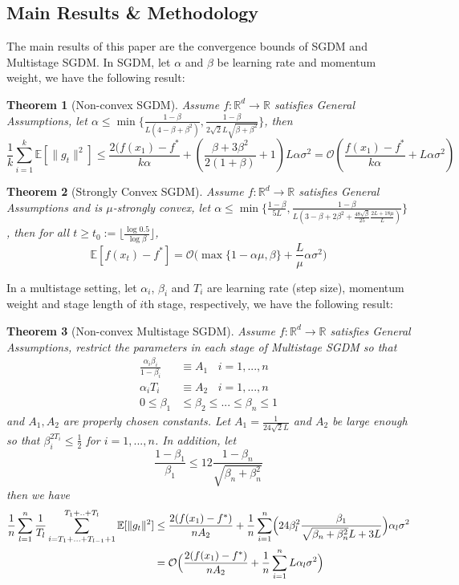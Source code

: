 \documentclass{article}
\newtheorem{theorem}{Theorem}[section]
\begin{document}
\subsection{Main Results \& Methodology}
The main results of this paper are the convergence bounds of SGDM and Multistage SGDM. In SGDM, let $\alpha$ and $\beta$ be learning rate and momentum weight, we have the following result:
\begin{theorem}[Non-convex SGDM]
	\label{theom41} Assume $f:\mathbb{R}^d \rightarrow \mathbb{R}$ satisfies General Assumptions, let $\alpha \leq \min\{\frac{1 - \beta}{L(4 - \beta + \beta^2)}, \frac{1 - \beta}{2\sqrt{2}L\sqrt{\beta + \beta^2}}\}$, then
	\[
		\frac{1}{k}\sum_{i = 1}^{k}\mathbb{E}[\|g_t\|^2] \leq \frac{2 (f(x_1) - f^*}{k\alpha} + (\frac{\beta + 3\beta^2}{2 (1 + \beta)} + 1)L\alpha\sigma^2 = \mathcal{O}(\frac{f(x_1) - f^*}{k\alpha} + L\alpha\sigma^2)
	\]
\end{theorem}
\begin{theorem}[Strongly Convex SGDM]
	\label{theom42} Assume $f:\mathbb{R}^d \rightarrow \mathbb{R}$ satisfies General Assumptions and is $\mu$-strongly convex, let $\alpha \leq \min\{\frac{1 - \beta}{5L}, \frac{1 - \beta}{L(3 - \beta + 2\beta^2 + \frac{48\sqrt{\beta}}{25}\frac{2L + 18\mu}{L})}\}$, then for all $t \geq t_0:= \lfloor\frac{\log 0.5}{\log \beta}\rfloor$, 
	\[
		\mathbb{E}[f(x_t) - f^*] = \mathcal{O}\bigl(\max\{1 - \alpha\mu, \beta\} + \frac{L}{\mu}\alpha\sigma^2\bigr)
	\]
\end{theorem}
In a multistage setting, let $\alpha_i$, $\beta_i$ and $T_i$ are learning rate (step size), momentum weight and stage length of $i$th stage, respectively, we have the following result:
\begin{theorem}[Non-convex Multistage SGDM]
	\label{theom43} Assume $f:\mathbb{R}^d \rightarrow \mathbb{R}$ satisfies General Assumptions, restrict the parameters in each stage of Multistage SGDM so that 
\begin{equation}
\label{eq41}
\begin{split}
\frac{\alpha_i\beta_i}{1 - \beta_i} &\equiv A_1 \ \ \ \ i = 1,...,n\\
\alpha_iT_i &\equiv A_2 \ \ \ \ i = 1,...,n\\
0 \leq \beta_1 &\leq \beta_2 \leq ... \leq \beta_n \leq 1
\end{split}
\end{equation}
and $A_1, A_2$ are properly chosen constants. Let $A_1 = \frac{1}{24\sqrt{2}L}$ and $A_2$ be large enough so that $\beta_i^{2T_i} \leq \frac{1}{2}$ for $i = 1,...,n$. In addition, let
\[
\frac{1 - \beta_1}{\beta_1} \leq 12 \frac{1 - \beta_n}{\sqrt{\beta_n + \beta_n^2}}
\] then we have
\[
\begin{split}
\frac{1}{n}\sum_{l = 1}^{n}\frac{1}{T_l}\sum_{i = T_1 + ... + T_{l - 1} + 1}^{T_1 + .. + T_l}\mathbb{E}[\|g_t\|^2] &\leq \frac{2(f(x_1) - f^*)}{nA_2} + \frac{1}{n}\sum_{i = 1}^n\Bigl(24\beta^2_l\frac{\beta_1}{\sqrt{\beta_n + \beta_n^2}L + 3L}\Bigr)\alpha_l\sigma^2\\
&= \mathcal{O}\Bigl(\frac{2(f(x_1) - f^*)}{nA_2} + \frac{1}{n}\sum_{i = 1}^nL\alpha_l\sigma^2\Bigr)
\end{split}
\]
\end{theorem}
\end{document}
